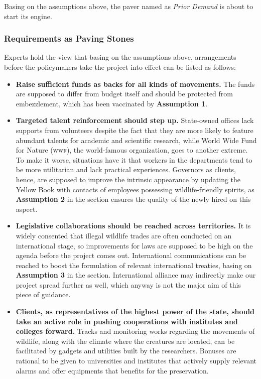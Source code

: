 \documentclass[12pt]{article}
\begin{document}
Basing on the assumptions above, the paver named as \textit{Prior Demand} is about to start its engine.
\clearpage
\subsubsection{Requirements as Paving Stones}
Experts hold the view that basing on the assumptions above, arrangements before the policymakers take the project into effect can be listed as follows:
\begin{itemize}
	\item \textbf{Raise sufficient funds as backs for all kinds of movements.} The funds are supposed to differ from budget itself and should be protected from embezzlement, which has been vaccinated by \textbf{Assumption 1}.
	\item \textbf{Targeted talent reinforcement should step up.} State-owned offices lack supports from volunteers despite the fact that they are more likely to feature abundant talents for academic and scientific research, while World Wide Fund for Nature (\textsc{wwf}), the world-famous organization, goes to another extreme. To make it worse, situations have it that workers in the departments tend to be more utilitarian and lack practical experiences. Governors as clients, hence, are supposed to improve the intrinsic appearance by updating the Yellow Book with contacts of employees possessing wildlife-friendly spirits, as \textbf{Assumption 2} in the section ensures the quality of the newly hired on this aspect.
	\item \textbf{Legislative collaborations should be reached across territories.} It is widely consented that illegal wildlife trades are often conducted on an international stage, so improvements for laws are supposed to be high on the agenda before the project comes out. International communications can be reached to boost the formulation of relevant international treaties, basing on \textbf{Assumption 3} in the section. International alliance may indirectly make our project spread further as well, which anyway is not the major aim of this piece of guidance.
	\item \textbf{Clients, as representatives of the highest power of the state, should take an active role in pushing cooperations with institutes and colleges forward.} Tracks and monitoring works regarding the movements of wildlife, along with the climate where the creatures are located, can be facilitated by gadgets and utilities built by the researchers. Bonuses are rational to be given to universities and institutes that actively supply relevant alarms and offer equipments that benefits for the preservation.

\end{itemize}
\end{document}
